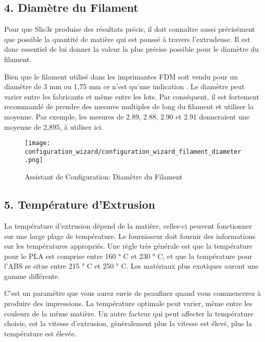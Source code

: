 \newpage
\subsection{4. Diam\`etre du Filament}
\label{sub:4_filament_diameter}
Pour que Slic3r produise des r\'esultats pr\'ecis, il doit conna\^itre aussi pr\'ecis\'ement que possible la quantit\'e de mati\`ere qui est pouss\'e \`a travers l'extrudeuse. Il est donc essentiel de lui donner la valeur la plus pr\'ecise possible pour le diam\`etre du filament.

Bien que le filament utilis\'e dans les imprimantes FDM soit vendu pour un diam\`etre de 3 mm ou 1,75 mm ce n'est qu'une indication . Le diam\`etre peut varier entre les fabricants et m\^eme entre les lots. Par cons\'equent, il est fortement recommand\'e de prendre des mesures multiples de long du filament et utiliser la moyenne. Par exemple, les mesures de 2.89, 2.88, 2.90 et 2.91 donneraient une moyenne de 2,895, \`a utiliser ici.

\begin{figure}[H]
\centering
\texttt{[image: configuration\_wizard/configuration\_wizard\_filament\_diameter.png]}
\caption{Assistant de Configuration: Diam\`etre du Filament}
\label{fig:configuration_wizard_filament_diameter}
\end{figure}

\newpage
\subsection{5. Temp\'erature d'Extrusion}
\label{sub:5_extrusion_temperature}
La temp\'erature d'extrusion d\'epend de la mati\`ere, celles-ci peuvent fonctionner sur une large plage de temp\'erature. Le fournisseur doit fournir des informations sur les temp\'eratures appropri\'es. Une r\`egle tr\`es g\'en\'erale est que la temp\'erature pour le PLA est comprise entre 160 ° C et 230 ° C, et que la temp\'erature pour l'ABS se situe entre 215 ° C et 250 ° C. Les mat\'eriaux plus exotiques auront une gamme diff\'erente.

C'est un param\`etre que vous aurez envie de peaufiner quand vous commencerez \`a produire des impressions. La temp\'erature optimale peut varier, m\^eme entre les couleurs de la m\^eme mati\`ere. Un autre facteur qui peut affecter la temp\'erature choisie, est la vitesse d'extrusion, g\'en\'eralement plus la vitesse est \'elev\'e, plus la temp\'erature est \'elev\'ee.

